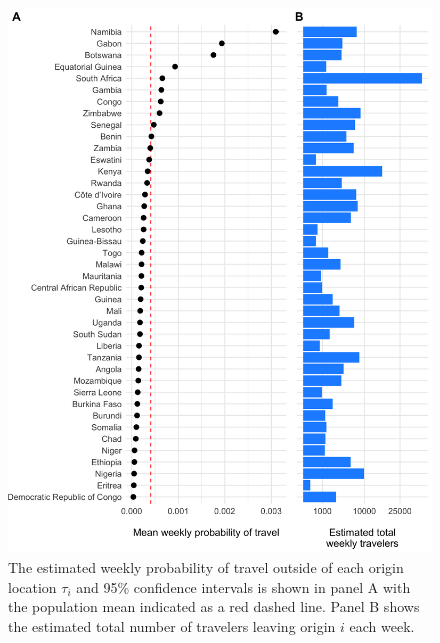 \documentclass[
]{book}
\begin{document}
\begin{figure}

{\centering \includegraphics[width=1\linewidth]{figures/mobility_travel_prob_tau} 

}

\caption{The estimated weekly probability of travel outside of each origin location $\tau_i$ and 95\% confidence intervals is shown in panel A with the population mean indicated as a red dashed line. Panel B shows the estimated total number of travelers leaving origin $i$ each week.}\label{fig:mobility-departure}
\end{figure}
\end{document}
